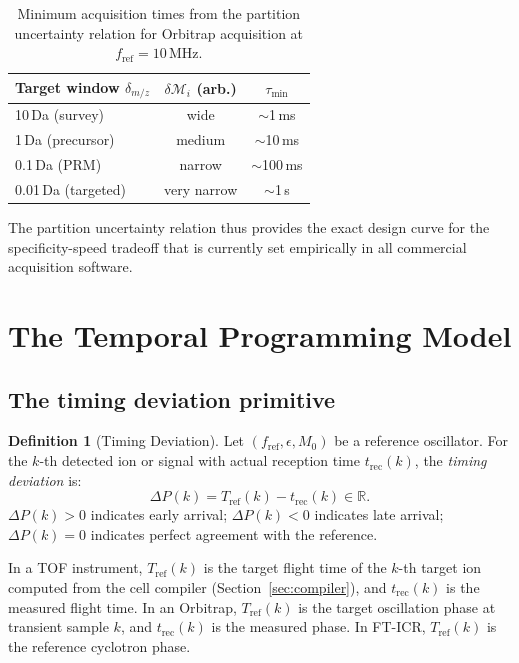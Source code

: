 \documentclass[twocolumn,10pt,a4paper]{article}
\theoremstyle{thmstyle}
\theoremstyle{definition}
\newtheorem{definition}[theorem]{Definition}
\theoremstyle{remark}
\newcommand{\R}{\mathbb{R}}
\newcommand{\DP}{\Delta P}
\newcommand{\Tref}{T_{\mathrm{ref}}}
\newcommand{\trec}{t_{\mathrm{rec}}}
\newcommand{\fref}{f_{\mathrm{ref}}}
\newcommand{\Mop}{\mathcal{M}}
\begin{document}
\begin{table}[h]
\centering
\caption{Minimum acquisition times from the partition uncertainty relation
for Orbitrap acquisition at $f_{\text{ref}} = 10$\,MHz.}
\label{tab:resolution}
\small
\begin{tabular}{lcc}
\toprule
Target window $\delta_{m/z}$ & $\delta\Mop_i$ (arb.) & $\tau_{\min}$ \\
\midrule
10\,Da (survey) & wide & $\sim$1\,ms \\
1\,Da (precursor) & medium & $\sim$10\,ms \\
0.1\,Da (PRM) & narrow & $\sim$100\,ms \\
0.01\,Da (targeted) & very narrow & $\sim$1\,s \\
\bottomrule
\end{tabular}
\end{table}

The partition uncertainty relation thus provides the exact design curve
for the specificity-speed tradeoff that is currently set empirically in
all commercial acquisition software.

\section{The Temporal Programming Model}
\label{sec:tp}

\subsection{The timing deviation primitive}

\begin{definition}[Timing Deviation]
\label{def:dp}
Let $(\fref, \epsilon, M_0)$ be a reference oscillator. For the $k$-th
detected ion or signal with actual reception time $\trec(k)$, the
\emph{timing deviation} is:
\begin{equation}
\DP(k) = \Tref(k) - \trec(k) \in \R.
\label{eq:dp}
\end{equation}
$\DP(k) > 0$ indicates early arrival; $\DP(k) < 0$ indicates late arrival;
$\DP(k) = 0$ indicates perfect agreement with the reference.
\end{definition}

In a TOF instrument, $\Tref(k)$ is the target flight time of the $k$-th
target ion computed from the cell compiler (Section~\ref{sec:compiler}),
and $\trec(k)$ is the measured flight time. In an Orbitrap, $\Tref(k)$
is the target oscillation phase at transient sample $k$, and $\trec(k)$
is the measured phase. In FT-ICR, $\Tref(k)$ is the reference cyclotron
phase.
\end{document}
